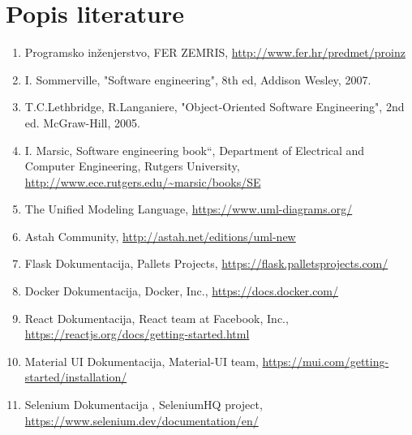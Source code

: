 \chapter*{Popis literature}
		
		
		\begin{enumerate}
			
			
			\item  Programsko inženjerstvo, FER ZEMRIS, \url{http://www.fer.hr/predmet/proinz}
			
			\item  I. Sommerville, "Software engineering", 8th ed, Addison Wesley, 2007.
			
			\item  T.C.Lethbridge, R.Langaniere, "Object-Oriented Software Engineering", 2nd ed. McGraw-Hill, 2005.
			
			\item  I. Marsic, Software engineering book``, Department of Electrical and Computer Engineering, Rutgers University, \url{http://www.ece.rutgers.edu/~marsic/books/SE}
			
			\item  The Unified Modeling Language, \url{https://www.uml-diagrams.org/}
			
			\item  Astah Community, \url{http://astah.net/editions/uml-new}

			\item  Flask Dokumentacija, Pallets Projects, \url{https://flask.palletsprojects.com/}

			\item  Docker Dokumentacija, Docker, Inc., \url{https://docs.docker.com/}

			\item  React Dokumentacija, React team at Facebook, Inc., \url{https://reactjs.org/docs/getting-started.html}

			\item  Material UI Dokumentacija, Material-UI team, \url{https://mui.com/getting-started/installation/}

			\item  Selenium Dokumentacija , SeleniumHQ project, \url{https://www.selenium.dev/documentation/en/}
		\end{enumerate}
		
		 